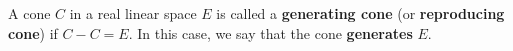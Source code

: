 A cone $C$ in a real linear space $E$ is called a \textbf{generating cone} (or \textbf{reproducing cone}) if $C - C = E$. In this case, we say that the cone \textbf{generates} $E$.
